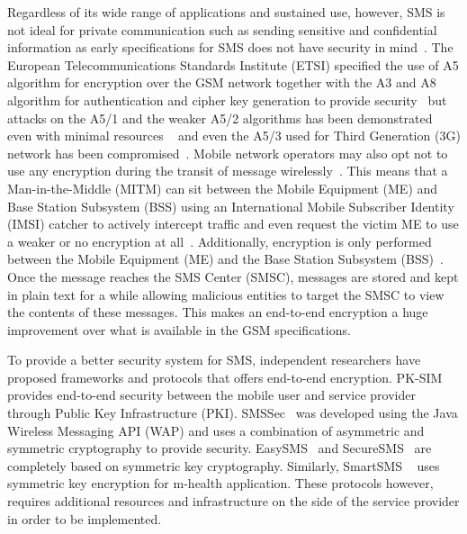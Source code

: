 \documentclass[journal]{./IEEE/IEEEtran}
\begin{document}
Regardless of its wide range of applications and sustained use, however, 
SMS is not ideal for private communication such as sending sensitive and 
confidential information as early specifications for SMS does not have security 
in mind~\cite{3gpp2}. The European Telecommunications Standards Institute (ETSI) 
specified the use of A5 algorithm for encryption over the GSM network together 
with the A3 and A8 algorithm for authentication and cipher key generation to 
provide security~\cite{Schiller2011} but attacks on the A5/1 and the weaker 
A5/2 algorithms has been demonstrated even with minimal resources
~\cite{a512001, a522007,Barkan_Biham_Keller_2003} and even the A5/3 used for 
Third Generation (3G) network has been compromised~\cite{a532010}. 
Mobile network operators may also opt not to use any encryption during the 
transit of message wirelessly~\cite{gsm348}. This means that a 
Man-in-the-Middle (MITM) can sit between the Mobile Equipment (ME) and 
Base Station Subsystem (BSS) using an International Mobile Subscriber Identity 
(IMSI) catcher to actively intercept traffic and even request the victim ME 
to use a weaker or no encryption at all~\cite{Cattaneo_DeMaio_Faruolo_Petrillo_2013}. 
Additionally, encryption is only performed between the Mobile Equipment (ME) 
and the Base Station Subsystem (BSS)~\cite{Schiller2011}. Once the message 
reaches the SMS Center (SMSC), messages are stored and kept in plain text for a 
while allowing malicious entities to target the SMSC to 
view the contents of these messages. This makes an end-to-end encryption a huge
improvement over what is available in the GSM specifications.

To provide a better security system for SMS, independent researchers have
proposed frameworks and protocols that offers end-to-end encryption.
PK-SIM~\cite{PKSIMcard07} provides end-to-end security between the mobile user 
and service provider through Public Key Infrastructure (PKI).
SMSSec~\cite{SMSSec08} was developed using the Java Wireless Messaging API (WAP)
and uses a combination of asymmetric and symmetric cryptography to provide
security. EasySMS~\cite{EasySMS14} and SecureSMS~\cite{SecureSMS14} are
completely based on symmetric key cryptography. Similarly, SmartSMS
~\cite{SmartSMS16} uses symmetric key encryption for m-health application.
These protocols however, requires additional resources and infrastructure
on the side of the service provider in order to be implemented.
\end{document}
